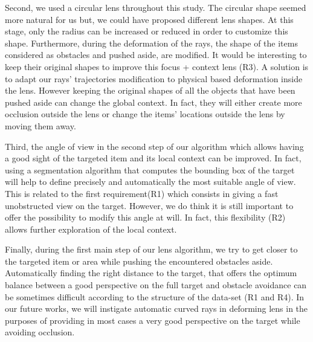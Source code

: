 Second, we used a circular lens throughout this study. The circular shape seemed more natural for us but, we could have proposed different lens shapes. At this stage, only the radius can be increased or reduced in order to customize this shape. Furthermore, during the deformation of the rays, the shape of the items considered as obstacles and pushed aside, are modified. It would be interesting to keep their original shapes to improve this focus + context lens (R3). A solution is to adapt our rays' trajectories modification to physical based deformation inside the lens. However keeping the original shapes of all the objects that have been pushed aside can change the global context. In fact, they will either create more occlusion outside the lens or change the items' locations outside the lens by moving them away.  


Third, the angle of view in the second step of our algorithm which allows having a good sight of the targeted item and its local context can be improved. In fact, using a segmentation algorithm that computes the bounding box of the target will help to define precisely and automatically the most suitable angle of view. This is related to the first requirement(R1) which consists in giving a fast unobstructed view on the target. However, we do think it is still important to offer the possibility to modify this angle at will. In fact, this flexibility (R2) allows further exploration of the local context.

Finally, during the first main step of our lens algorithm, we try to get closer to the targeted item or area while pushing the encountered obstacles aside. Automatically finding the right distance to the target, that offers the optimum balance between a good perspective on the full target and obstacle avoidance can be sometimes difficult according to the structure of the data-set (R1 and R4). In our future works, we will instigate automatic curved rays in deforming lens in the purposes of providing in most cases a very good perspective on the target while avoiding occlusion. 

